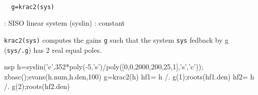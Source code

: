 \begin{mandesc}
   \\ %
\end{mandesc}
\begin{calling_sequence}
\begin{verbatim}
  g=krac2(sys)  
\end{verbatim}
\end{calling_sequence}
\begin{parameters}
  \begin{varlist}
    : SISO linear system (syslin)
    : constant
  \end{varlist}
\end{parameters}
\begin{mandescription}
  \verb!krac2(sys)! computes the gains \verb!g! such that the system
  \verb!sys! fedback by g (\verb!sys/.g!) has  2 real equal poles.
\end{mandescription}
\begin{examples}
  \begin{mintednsp}{nsp}
    h=syslin('c',352*poly(-5,'s')/poly([0,0,2000,200,25,1],'s','c'));
    xbasc();evans(h.num,h.den,100)
    g=krac2(h)
    hf1= h /. g(1);roots(hf1.den)
    hf2= h /. g(2);roots(hf2.den)
  \end{mintednsp}
\end{examples}
\begin{manseealso}
     
\end{manseealso}
